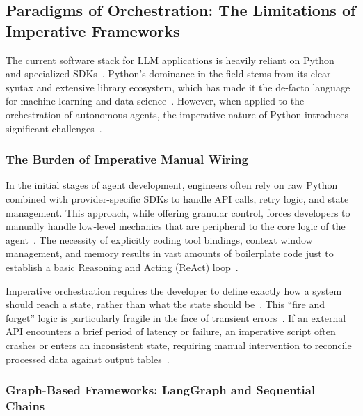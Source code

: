 \documentclass[sigconf,nonacm]{acmart}
\begin{document}
\subsection{Paradigms of Orchestration: The Limitations of Imperative Frameworks}
\label{sec:litreview:imperative}

The current software stack for LLM applications is heavily reliant on
Python~\cite{vanrossum2009python} and specialized SDKs~\cite{autogen2024}.
Python's dominance in the field stems from its clear syntax and extensive
library ecosystem, which has made it the de-facto language for machine
learning and data science~\cite{vanrossum2009python}. However, when applied
to the orchestration of autonomous agents, the imperative nature of Python
introduces significant challenges~\cite{docker2025cagent,crewai2024}.

\subsubsection{The Burden of Imperative Manual Wiring}
\label{sec:litreview:wiring}

In the initial stages of agent development, engineers often rely on raw
Python combined with provider-specific SDKs to handle API calls, retry
logic, and state management. This approach, while offering granular control,
forces developers to manually handle low-level mechanics that are
peripheral to the core logic of the agent~\cite{docker2025cagent}. The
necessity of explicitly coding tool bindings, context window management, and
memory results in vast amounts of boilerplate code just to establish a basic
Reasoning and Acting (ReAct) loop~\cite{yao2023react}.

Imperative orchestration requires the developer to define exactly how a
system should reach a state, rather than what the state should
be~\cite{docker2025cagent}. This ``fire and forget'' logic is particularly
fragile in the face of transient errors~\cite{docker2025cagent}. If an
external API encounters a brief period of latency or failure, an imperative
script often crashes or enters an inconsistent state, requiring manual
intervention to reconcile processed data against output
tables~\cite{docker2025cagent}.

\subsubsection{Graph-Based Frameworks: LangGraph and Sequential Chains}
\label{sec:litreview:langgraph}
\end{document}
